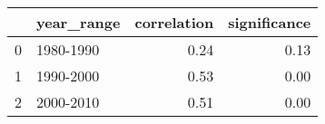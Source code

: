 \begin{tabular}{llrr}
\toprule
{} & year\_range &  correlation &  significance \\
\midrule
0 &  1980-1990 &         0.24 &          0.13 \\
1 &  1990-2000 &         0.53 &          0.00 \\
2 &  2000-2010 &         0.51 &          0.00 \\
\bottomrule
\end{tabular}
